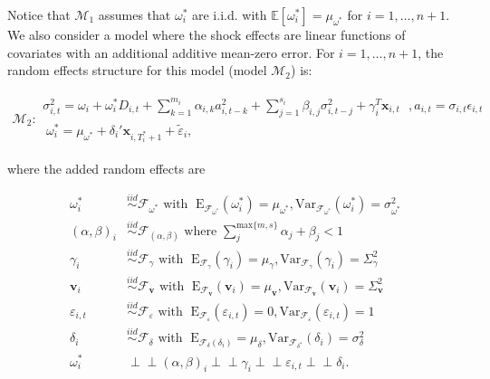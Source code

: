 \documentclass[11pt]{article}
\newcommand{\x}{\textbf{x}}
\def\mbf#1{\mathbf{#1}} %
\newcommand{\simiid}{\stackrel{iid}{\sim}} %
\newcommand{\indep}{\perp \!\!\! \perp } %
\def\mrm#1{\mathrm{#1}} %
\def\t#1{\tilde{#1}} %
\def\mc#1{\mathcal{#1}} %
\def\E{\mathbb{E}} %
\def\mc#1{\mathcal{#1}}
\theoremstyle{definition}
\begin{document}
Notice that $\mc{M}_1$ assumes that $\omega^{*}_i$ are i.i.d. with $\E[ \omega^{*}_i]=\mu_{\omega^{*}}$ 
for $i = 1, \ldots, n+1$. We also consider a model where the shock effects are linear functions of covariates with an additional additive mean-zero error. For $i = 1, \ldots, n+1$, the random effects structure for this model (model $\mc{M}_2$) is:




\begin{align}
\mc{M}_2 \colon \begin{array}{l}
   \sigma^{2}_{i,t} = \omega_{i} + \omega^{*}_i D_{i,t}  + \sum^{m_{i}}_{k=1}\alpha_{i,k}a^{2}_{i,t-k} + \sum_{j=1}^{s_{i}}\beta_{i,j}\sigma_{i,t-j}^{2} + \gamma_{i}^{T} \x_{i,t} \text{ }, a_{i,t} = \sigma_{i,t}\epsilon_{i,t}\\[.2cm]
  \; \omega_i^{*} = \mu_{\omega^{*}}+\delta_{i}'\mbf{x}_{i, T_i^*+1}+ \t{\varepsilon}_{i},
\end{array}\label{model2}
\end{align}

 where the added random effects are

\begin{align*}
\omega^{*}_i &\simiid \mc{F}_{\omega^{*}} \text{ with }  \; \mrm{E}_{\mc{F}_{\omega^{*}}}(\omega^{*}_i) = \mu_{\omega^{*}}, \mrm{Var}_{\mc{F}_{\omega^{*}}}(\omega^{*}_i)  = \sigma^2_{\omega^{*}}  \\
(\alpha, \beta)_i &\simiid \mc{F}_{(\alpha, \beta)} \text{ where } \sum^{ \text{max} \{m,s \} }_{j}\alpha_j + \beta_j < 1 \\
   \gamma_i &\simiid \mc{F}_{\gamma} \text{ with }  \; \mrm{E}_{\mc{F}_{\gamma}}(\gamma_i) = \mu_{\gamma}, \mrm{Var}_{\mc{F}_{\gamma}}(\gamma_i)  = \Sigma^2_{\gamma} \\
   \mathbf{v}_i &\simiid \mc{F}_{\mathbf{v}} \text{ with }  \; \mrm{E}_{\mc{F}_{\mathbf{v}}}(\mathbf{v}_i) = \mu_{\mathbf{v}}, \mrm{Var}_{\mc{F}_{\mathbf{v}}}(\mathbf{v}_i)  = \Sigma^2_{\mathbf{v}} \\
\varepsilon_{i,t} & \simiid  \mc{F}_{\varepsilon} \text{ with }  \; \mrm{E}_{\mc{F}_{\varepsilon}}(\varepsilon_{i,t}) = 0, \mrm{Var}_{\mc{F}_{\varepsilon}}(\varepsilon_{i,t})  = 1 \\
\delta_i &\simiid \mc{F}_{\delta} \text{ with }  \; \mrm{E}_{\mc{F}_{\delta}(\delta_i)} = \mu_{\delta}, \mrm{Var}_{\mc{F}_{\delta^{*}}}(\delta_i)  = \sigma^{2}_{\delta} \\
\omega^{*}_i &\indep  (\alpha, \beta)_i \indep \gamma_i \indep \varepsilon_{i,t} \indep \delta_{i}.
\end{align*}
\end{document}
